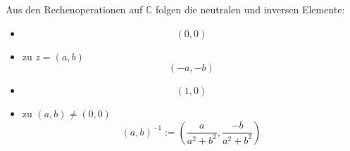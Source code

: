 Aus den Rechenoperationen auf $\mathbb{C}$ folgen die neutralen und inversen Elemente:

\begin{itemize}[label={},leftmargin=*]

    \item {}
    $$(0, 0)$$
    
    \item {} zu $z = (a, b)$
    $$(-a, -b)$$
    
    \item {}
    $$(1, 0)$$
    
    \item {} zu $(a, b) \neq (0, 0)$
    $$(a, b)^{-1} := \left(\frac{a}{a^2+b^2}, \frac{-b}{a^2+b^2}\right)$$
    
\end{itemize}